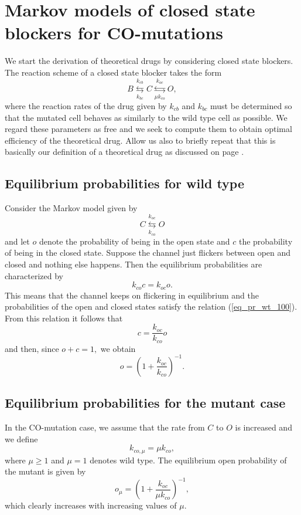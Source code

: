 \section[Closed state blockers for CO-mutations]{Markov models of closed state blockers for CO-mutations}


We start the derivation of theoretical drugs by considering closed state blockers.
The reaction scheme of a closed state blocker takes the form
\begin{equation}
B\underset{k_{bc}}{\overset{k_{cb}}{\leftrightarrows}}C\underset{\mu
k_{co}}{\overset{k_{oc}}{\leftrightarrows}}O, \label{closed_drg}
\end{equation}
where the reaction rates of the drug given by $k_{cb}$ and $k_{bc}$ must be determined
so that the mutated cell behaves as similarly to the wild type cell as possible. We regard these parameters as
free and we seek to compute them to obtain optimal efficiency of the theoretical drug. Allow us also to briefly repeat that this is basically our definition of a theoretical drug as discussed on page \pageref{theoreticaldrugs}.

\subsection{Equilibrium probabilities for wild type}
\label{eq_pr_wt}
Consider the Markov model given by
\[
C\underset{k_{co}}{\overset{k_{oc}}{\leftrightarrows}}O
\]
and let $o$ denote the probability of being in the open state and $c$ the probability of being
in the closed state. Suppose the channel just flickers between open and closed and nothing else happens. Then
the equilibrium probabilities are characterized by
\begin{equation}
k_{co}c=k_{oc}o. \label{eq_pr_wt_100}
\end{equation}
This means that the channel keeps on flickering in equilibrium and the probabilities of the open and closed states satisfy the relation (\ref{eq_pr_wt_100}). From this relation it follows that
\[
c=\frac{k_{oc}}{k_{co}}o
\]
and then, since $o+c=1,$ we obtain
\[
o=\left(  1+\frac{k_{oc}}{k_{co}}\right)  ^{-1}.
\]

\subsection{Equilibrium probabilities for the mutant case}


In the CO-mutation case, we assume that the rate from $C$ to $O$ is increased and
we define
\begin{equation}
k_{co,\mu}=\mu k_{co}, \label{kcomu}
\end{equation}
where $\mu\geqslant1$ and $\mu=1$ denotes wild type. The equilibrium
open probability of the mutant is given by
\[
o_\mu=\left(  1+\frac{k_{oc}}{\mu k_{co}}\right)^{-1},
\]
which clearly increases with increasing values of $\mu$.

